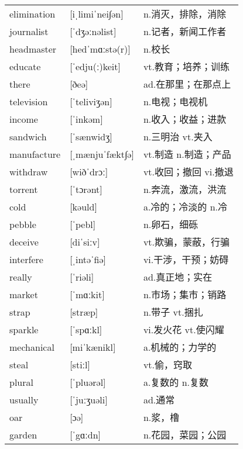 \documentclass[a4paper]{article}
\begin{document}
\section{}
\begin{tabular}{l l l}

elimination & [iˌlimiˈnei∫ən] & n.消灭，排除，消除 \\
journalist & [ˈdʒəːnəlist] & n.记者，新闻工作者 \\
headmaster & [hedˈmɑːstə(r)] & n.校长 \\
educate & [ˈedju(ː)keit] & vt.教育；培养；训练 \\
there & [ðeə] & ad.在那里；在那点上 \\
television & [ˈteliviʒən] & n.电视；电视机 \\
income & [ˈinkəm] & n.收入；收益；进款 \\
sandwich & [ˈsænwidʒ] & n.三明治 vt.夹入 \\
manufacture & [ˌmænjuˈfækt∫ə] & vt.制造 n.制造；产品 \\
withdraw & [wiðˈdrɔː] & vt.收回；撤回 vi.撤退 \\
torrent & [ˈtɔrənt] & n.奔流，激流，洪流 \\
cold & [kəuld] & a.冷的；冷淡的 n.冷 \\
pebble & [ˈpebl] & n.卵石，细砾 \\
deceive & [diˈsiːv] & vt.欺骗，蒙蔽，行骗 \\
interfere & [ˌintəˈfiə] & vi.干涉，干预；妨碍 \\
really & [ˈriəli] & ad.真正地；实在 \\
market & [ˈmɑːkit] & n.市场；集市；销路 \\
strap & [stræp] & n.带子 vt.捆扎 \\
sparkle & [ˈspɑːkl] & vi.发火花 vt.使闪耀 \\
mechanical & [miˈkænikl] & a.机械的；力学的 \\
steal & [stiːl] & vt.偷，窍取 \\
plural & [ˈpluərəl] & a.复数的 n.复数 \\
usually & [ˈjuːʒuəli] & ad.通常 \\
oar & [ɔə] & n.浆，橹 \\
garden & [ˈgɑːdn] & n.花园，菜园；公园 \\

\end{tabular}
\end{document}
